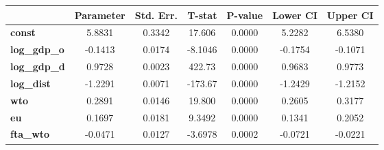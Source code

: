 \documentclass{article}
\begin{document}
\begin{center}
\begin{tabular}{lclc}
\end{tabular}
\begin{tabular}{lcccccc}
                     & \textbf{Parameter} & \textbf{Std. Err.} & \textbf{T-stat} & \textbf{P-value} & \textbf{Lower CI} & \textbf{Upper CI}  \\
\midrule
\textbf{const}       &       5.8831       &       0.3342       &      17.606     &      0.0000      &       5.2282      &       6.5380       \\
\textbf{log\_gdp\_o} &      -0.1413       &       0.0174       &     -8.1046     &      0.0000      &      -0.1754      &      -0.1071       \\
\textbf{log\_gdp\_d} &       0.9728       &       0.0023       &      422.73     &      0.0000      &       0.9683      &       0.9773       \\
\textbf{log\_dist}   &      -1.2291       &       0.0071       &     -173.67     &      0.0000      &      -1.2429      &      -1.2152       \\
\textbf{wto}         &       0.2891       &       0.0146       &      19.800     &      0.0000      &       0.2605      &       0.3177       \\
\textbf{eu}          &       0.1697       &       0.0181       &      9.3492     &      0.0000      &       0.1341      &       0.2052       \\
\textbf{fta\_wto}    &      -0.0471       &       0.0127       &     -3.6978     &      0.0002      &      -0.0721      &      -0.0221       \\
\bottomrule
\end{tabular}
\end{center}
\end{document}
